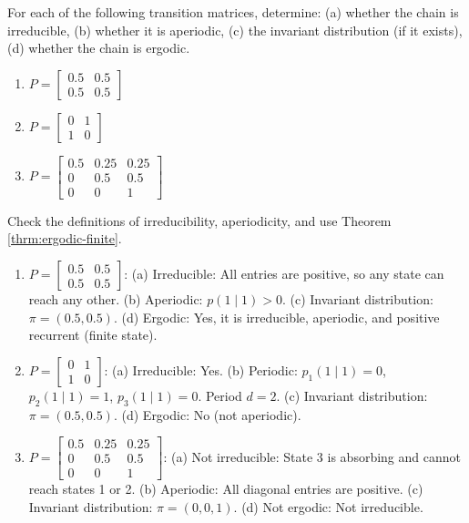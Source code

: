 \begin{Exercise}
\label{exr:finite-state-summary}
For each of the following transition matrices, determine: (a) whether the chain is irreducible, (b) whether it is aperiodic, (c) the invariant distribution (if it exists), (d) whether the chain is ergodic.

\begin{enumerate}
\item $P = \begin{bmatrix} 0.5 & 0.5 \\ 0.5 & 0.5 \end{bmatrix}$
\item $P = \begin{bmatrix} 0 & 1 \\ 1 & 0 \end{bmatrix}$
\item $P = \begin{bmatrix} 0.5 & 0.25 & 0.25 \\ 0 & 0.5 & 0.5 \\ 0 & 0 & 1 \end{bmatrix}$
\end{enumerate}

\begin{hint}
Check the definitions of irreducibility, aperiodicity, and use Theorem \ref{thrm:ergodic-finite}.
\end{hint}
\end{Exercise}

\begin{Solution}
\begin{enumerate}
\item $P = \begin{bmatrix} 0.5 & 0.5 \\ 0.5 & 0.5 \end{bmatrix}$:
(a) Irreducible: All entries are positive, so any state can reach any other.
(b) Aperiodic: $p(1 \mid 1) > 0$.
(c) Invariant distribution: $\pi = (0.5, 0.5)$.
(d) Ergodic: Yes, it is irreducible, aperiodic, and positive recurrent (finite state).
\item $P = \begin{bmatrix} 0 & 1 \\ 1 & 0 \end{bmatrix}$:
(a) Irreducible: Yes.
(b) Periodic: $p_1(1 \mid 1) = 0$, $p_2(1 \mid 1) = 1$, $p_3(1 \mid 1) = 0$. Period $d = 2$.
(c) Invariant distribution: $\pi = (0.5, 0.5)$.
(d) Ergodic: No (not aperiodic).
\item $P = \begin{bmatrix} 0.5 & 0.25 & 0.25 \\ 0 & 0.5 & 0.5 \\ 0 & 0 & 1 \end{bmatrix}$:
(a) Not irreducible: State 3 is absorbing and cannot reach states 1 or 2.
(b) Aperiodic: All diagonal entries are positive.
(c) Invariant distribution: $\pi = (0, 0, 1)$.
(d) Not ergodic: Not irreducible.
\end{enumerate}
\end{Solution}

